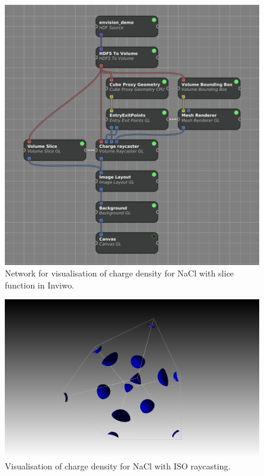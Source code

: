 \documentclass[a4paper,12pt]{article}
\begin{document}
\begin{figure} [H]
\centering
\includegraphics[scale=0.4]{screenshot_NaCl_laddningstathetslicenatverk.png}
\caption{Network for visualisation of charge density for NaCl with slice function in Inviwo.}
\label{fig:screenshot_NaCl_laddningstathetslicenatverk}
\end{figure}

\begin{figure} [H]
\centering
\includegraphics[scale=0.3]{screenshot_NaCl_laddningstathet_iso.png}
\caption{Visualisation of charge density for NaCl with ISO raycasting.}
\label{fig:screenshot_NaCl_laddningstathet_iso}
\end{figure}
\end{document}
